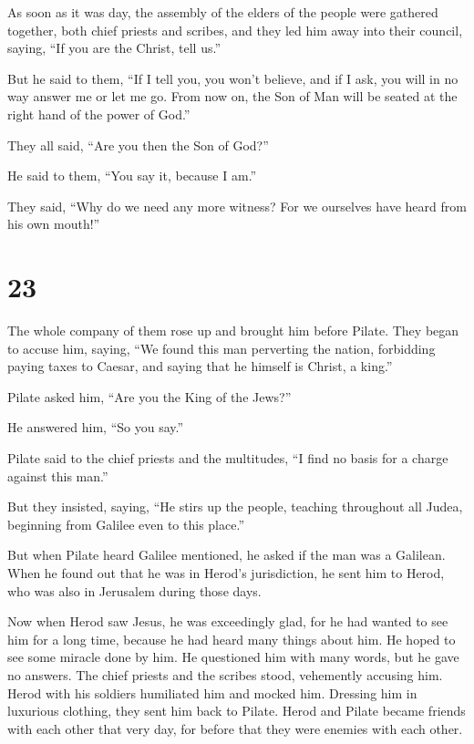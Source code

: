  As soon as it was day, the assembly of the elders of the
people were gathered together, both chief priests and scribes, and they
led him away into their council, saying,  ``If you are
the Christ, tell us.''

But he said to them, ``If I tell you, you won't believe, 
and if I ask, you will in no way answer me or let me go. 
From now on, the Son of Man will be seated at the right hand of the
power of God.''

 They all said, ``Are you then the Son of God?''

He said to them, ``You say it, because I am.''

 They said, ``Why do we need any more witness? For we
ourselves have heard from his own mouth!''

\hypertarget{section-13}{%
\section{23}\label{section-13}}

 The whole company of them rose up and brought him before
Pilate.  They began to accuse him, saying, ``We found this
man perverting the nation, forbidding paying taxes to Caesar, and saying
that he himself is Christ, a king.''

 Pilate asked him, ``Are you the King of the Jews?''

He answered him, ``So you say.''

 Pilate said to the chief priests and the multitudes, ``I
find no basis for a charge against this man.''

 But they insisted, saying, ``He stirs up the people,
teaching throughout all Judea, beginning from Galilee even to this
place.''

 But when Pilate heard Galilee mentioned, he asked if the
man was a Galilean.  When he found out that he was in
Herod's jurisdiction, he sent him to Herod, who was also in Jerusalem
during those days.

 Now when Herod saw Jesus, he was exceedingly glad, for he
had wanted to see him for a long time, because he had heard many things
about him. He hoped to see some miracle done by him.  He
questioned him with many words, but he gave no answers. 
The chief priests and the scribes stood, vehemently accusing him.
 Herod with his soldiers humiliated him and mocked him.
Dressing him in luxurious clothing, they sent him back to Pilate.
 Herod and Pilate became friends with each other that
very day, for before that they were enemies with each other.

